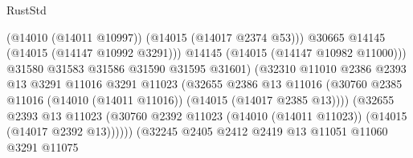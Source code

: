 \begin{lexlean}{RustStd}
\begin{coremodule}
                                                (@14010 (@14011 @10997))
                                                (@14015 (@14017 @2374 @53)))
                                              @30665
                                              @14145
                                              (@14015 (@14147 @10992 @3291)))
                                            @14145
                                            (@14015 (@14147 @10982 @11000)))
                                          @31580
                                          @31583
                                          @31586
                                          @31590
                                          @31595
                                          @31601)
                                        (@32310
                                          @11010
                                          @2386
                                          @2393
                                          @13
                                          @3291
                                          @11016
                                          @3291
                                          @11023
                                          (@32655
                                            @2386
                                            @13
                                            @11016
                                            (@30760
                                              @2385
                                              @11016
                                              (@14010 (@14011 @11016))
                                              (@14015 (@14017 @2385 @13))))
                                          (@32655
                                            @2393
                                            @13
                                            @11023
                                            (@30760
                                              @2392
                                              @11023
                                              (@14010 (@14011 @11023))
                                              (@14015 (@14017 @2392 @13))))))
                                      (@32245
                                        @2405
                                        @2412
                                        @2419
                                        @13
                                        @11051
                                        @11060
                                        @3291
                                        @11075

\end{coremodule}
\end{lexlean}
